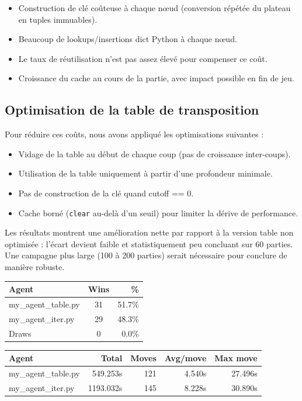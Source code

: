 \begin{itemize}
    \item Construction de clé coûteuse à chaque nœud (conversion répétée du plateau en tuples immuables).
    \item Beaucoup de lookups/insertions dict Python à chaque nœud.
    \item Le taux de réutilisation n’est pas assez élevé pour compenser ce coût.
    \item Croissance du cache au cours de la partie, avec impact possible en fin de jeu.
\end{itemize}

\subsection{Optimisation de la table de transposition}
Pour réduire ces coûts, nous avons appliqué les optimisations suivantes :

\begin{itemize}
    \item Vidage de la table au début de chaque coup (pas de croissance inter-coups).
    \item Utilisation de la table uniquement à partir d'une profondeur minimale.
    \item Pas de construction de la clé quand cutoff == 0.
    \item Cache borné (\texttt{clear} au-delà d'un seuil) pour limiter la dérive de performance.
\end{itemize}

Les résultats montrent une amélioration nette par rapport à la version table non optimisée : l'écart devient faible et statistiquement peu concluant sur 60 parties. Une campagne plus large (100 à 200 parties) serait nécessaire pour conclure de manière robuste.

\begin{tabular}{|l|c|r|}
    \hline
    Agent & Wins & \% \\
    \hline
    my\_agent\_table.py & 31 & 51.7\% \\
    my\_agent\_iter.py & 29 & 48.3\% \\
    Draws & 0 & 0.0\%\\
    \hline 
\end{tabular}
\begin{tabular}{|l|r|r|r|r|}
    \hline
    Agent & Total & Moves & Avg/move & Max move \\
    \hline
    my\_agent\_table.py & 549.253s & 121 & 4.540s & 27.496s \\
    my\_agent\_iter.py & 1193.032s & 145 & 8.228s & 30.890s \\
    \hline
\end{tabular}

